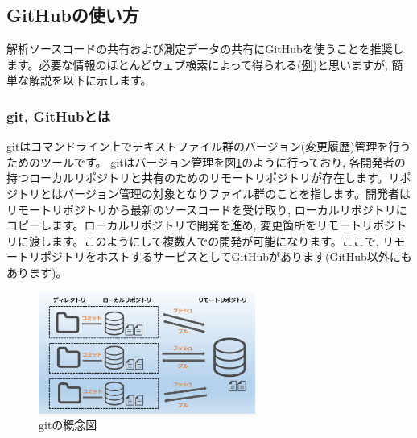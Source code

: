\subsection{GitHubの使い方}
解析ソースコードの共有および測定データの共有にGitHubを使うことを推奨します。必要な情報のほとんどウェブ検索によって得られる(\href{https://tech-blog.rakus.co.jp/entry/20200529/git}{例})と思いますが, 簡単な解説を以下に示します。

\subsubsection{git, GitHubとは}
gitはコマンドライン上でテキストファイル群のバージョン(変更履歴)管理を行うためのツールです。
gitはバージョン管理を図\ref{fig:git_desc}のように行っており, 各開発者の持つローカルリポジトリと共有のためのリモートリポジトリが存在します\cite{github}。リポジトリとはバージョン管理の対象となりファイル群のことを指します。開発者はリモートリポジトリから最新のソースコードを受け取り, ローカルリポジトリにコピーします。ローカルリポジトリで開発を進め, 変更箇所をリモートリポジトリに渡します。このようにして複数人での開発が可能になります。ここで, リモートリポジトリをホストするサービスとしてGitHubがあります(GitHub以外にもあります)。
\begin{figure}
    \centering
    \includegraphics[height=4cm]{git_desc.png}
    \caption{gitの概念図\cite{github}}
    \label{fig:git_desc}
\end{figure}

